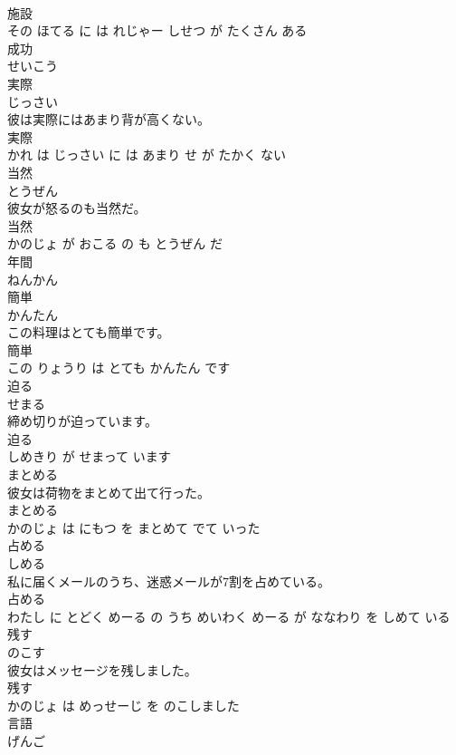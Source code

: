\documentclass[8pt]{extreport}
\begin{document}
\begin{CJK}{UTF8}{min}
\\	施設 
\\	その ほてる に は れじゃー しせつ が たくさん ある			
\\	成功	
\\	せいこう			
\\	実際	
\\	じっさい			
\\	彼は実際にはあまり背が高くない。	
\\	実際 
\\	かれ は じっさい に は あまり せ が たかく ない			
\\	当然	
\\	とうぜん			
\\	彼女が怒るのも当然だ。	
\\	当然 
\\	かのじょ が おこる の も とうぜん だ			
\\	年間	
\\	ねんかん			
\\	簡単	
\\	かんたん			
\\	この料理はとても簡単です。	
\\	簡単 
\\	この りょうり は とても かんたん です			
\\	迫る	
\\	せまる			
\\	締め切りが迫っています。	
\\	迫る 
\\	しめきり が せまって います			
\\	まとめる	
\\	彼女は荷物をまとめて出て行った。	
\\	まとめる 
\\	かのじょ は にもつ を まとめて でて いった			
\\	占める	
\\	しめる			
\\	私に届くメールのうち、迷惑メールが7割を占めている。	
\\	占める 
\\	わたし に とどく めーる の うち めいわく めーる が ななわり を しめて いる			
\\	残す	
\\	のこす			
\\	彼女はメッセージを残しました。	
\\	残す 
\\	かのじょ は めっせーじ を のこしました			
\\	言語	
\\	げんご			

\end{CJK}
\end{document}
